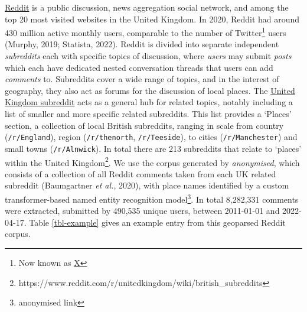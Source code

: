 \documentclass[
]{article}
\begin{document}
\href{https://reddit.com}{Reddit} is a public discussion, news
aggregation social network, and among the top 20 most visited websites
in the United Kingdom. In 2020, Reddit had around 430 million active
monthly users, comparable to the number of Twitter\footnote{Now known as
  \href{x.com}{X}} users (Murphy, 2019; Statista, 2022). Reddit is
divided into separate independent \emph{subreddits} each with specific
topics of discussion, where \emph{users} may submit \emph{posts} which
each have dedicated nested conversation threads that users can add
\emph{comments} to. Subreddits cover a wide range of topics, and in the
interest of geography, they also act as forums for the discussion of
local places. The \href{https://reddit.com/r/unitedkingdom}{United
Kingdom subreddit} acts as a general hub for related topics, notably
including a list of smaller and more specific related subreddits. This
list provides a `Places' section, a collection of local British
subreddits, ranging in scale from country (\texttt{/r/England}), region
(\texttt{/r/thenorth}, \texttt{/r/Teeside}), to cities
(\texttt{/r/Manchester}) and small towns (\texttt{/r/Alnwick}). In total
there are 213 subreddits that relate to `places' within the United
Kingdom\footnote{https://www.reddit.com/r/unitedkingdom/wiki/british\_subreddits}.
We use the corpus generated by \emph{anonymised}, which consists of a
collection of all Reddit comments taken from each UK related subreddit
(Baumgartner \emph{et al.}, 2020), with place names identified by a
custom transformer-based named entity recognition model\footnote{anonymised
  link}. In total 8,282,331 comments were extracted, submitted by
490,535 unique users, between 2011-01-01 and 2022-04-17. Table
\ref{tbl-example} gives an example entry from this geoparsed Reddit
corpus.
\end{document}
